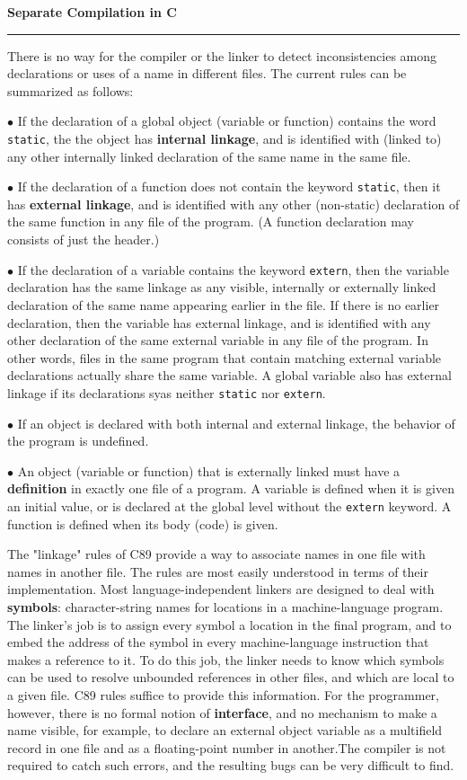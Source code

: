 \nopagenumbers
{\bf Separate Compilation in C}
\vskip 1mm
\hrule

\vskip 6pt
There is no way for the compiler or the linker to detect inconsistencies among declarations or uses of a name in different files. The current rules can be summarized as follows:

\vskip 6pt
$\bullet$ If the declaration of a global object (variable or function) contains the word {\tt static}, the the object has {\bf internal linkage}, and is identified with (linked to) any other internally linked declaration of the same name in the same file.

\vskip 6pt
$\bullet$ If the declaration of a function does not contain the keyword {\tt static}, then  it has {\bf external linkage}, and is identified with any other (non-static) declaration of the same function in any file of the program. (A function declaration may consists of just the header.)

\vskip 6pt
$\bullet$ If the declaration of a variable contains the keyword {\tt extern}, then the variable declaration has the same linkage as any visible, internally or externally linked declaration of the same name appearing earlier in the file. If there is no earlier declaration, then the variable has external linkage, and is identified with any other declaration of the same external variable in any file of the program. In other words, files in the same program that contain matching external variable declarations actually share the same variable. A global variable also has external linkage if its declarations syas neither {\tt static} nor {\tt extern}.

\vskip 6pt
$\bullet$ If an object is declared with both internal and external linkage, the behavior of the program is undefined.

\vskip 6pt
$\bullet$ An object (variable or function) that is externally linked must have a {\bf definition} in exactly one file of a program. A variable is defined when it is given an initial value, or is declared at the global level without the {\tt extern} keyword. A function is defined when its body (code) is given.

\vskip 6pt
The "linkage" rules of C89 provide a way to associate names in one file with names in another file. The rules are most easily understood in terms of their implementation. Most language-independent linkers are designed to deal with {\bf symbols}: character-string names for locations in a machine-language program. The linker's job is to assign every symbol a location in the final program, and to embed the address of the symbol in every machine-language instruction that makes a reference to it. To do this job, the linker needs to know which symbols can be used to resolve unbounded references in other files, and which are local to a given file. C89 rules suffice to provide this information. For the programmer, however, there is no formal notion of {\bf interface}, and no mechanism to make a name visible, for example, to declare an external object variable as a multifield record in one file and as a floating-point number in another.The compiler is not required to catch such errors, and the resulting bugs can be very difficult to find.

